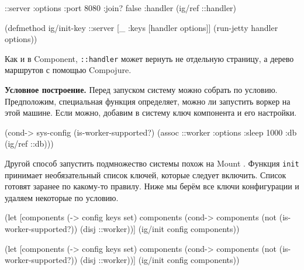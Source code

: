 \else

\begin{english}
  \begin{clojure}
{::server {:options {:port 8080 :join? false}
           :handler (ig/ref ::handler)}}

(defmethod ig/init-key ::server
  [_ {:keys [handler options]}]
  (run-jetty handler options))
  \end{clojure}
\end{english}

\fi

Как и в Component, \verb|::handler| может вернуть не отдельную
страницу, а дерево маршрутов с помощью Compojure.


\textbf{Условное построение.} Перед запуском систему можно собрать по
условию. Предположим, специальная функция определяет, можно ли запустить воркер
на этой машине. Если можно, добавим в систему ключ компонента и его настройки.

\begin{english}
  \begin{clojure}
(cond-> sys-config
  (is-worker-supported?)
  (assoc ::worker {:options {:sleep 1000}
                   :db (ig/ref ::db)}))
  \end{clojure}
\end{english}

Другой способ запустить подмножество системы похож на
Mount . Функция \verb|init| принимает необязательный
список ключей, которые следует включить. Список готовят заранее по какому-то
правилу. Ниже мы берём все ключи конфигурации и удаляем некоторые по условию.

\ifnarrow

\begin{english}
  \begin{clojure}
(let [components (-> config keys set)
      components
      (cond-> components
        (not (is-worker-supported?))
        (disj ::worker))]
  (ig/init config components))
  \end{clojure}
\end{english}

\else

\begin{english}
  \begin{clojure}
(let [components (-> config keys set)
      components (cond-> components
                   (not (is-worker-supported?))
                   (disj ::worker))]
  (ig/init config components))
  \end{clojure}
\end{english}

